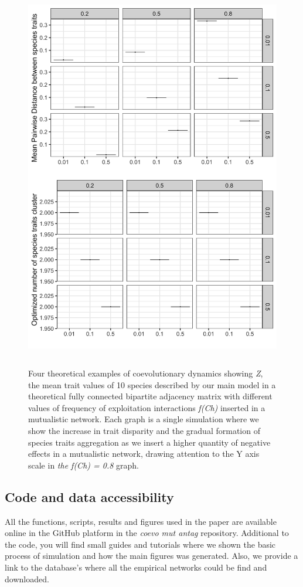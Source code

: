 \documentclass[a4paper, 12pt]{article}
\begin{document}
\begin{singlespace}
\begin{figure}[H]
 \centering
  \includegraphics[width = \linewidth, height = 17cm]{Sup_Figura_6.png}
  \vspace*{-7mm}
  \caption{Four theoretical examples of coevolutionary dynamics showing \textit{Z}, the mean trait values of 10 species described by our main model in a theoretical fully connected bipartite adjacency matrix with different values of frequency of exploitation interactions \textit{f(Ch)} inserted in a mutualistic network. Each graph is a single simulation where we show the increase in trait disparity and the gradual formation of species traits aggregation as we insert a higher quantity of negative effects in a mutualistic network, drawing attention to the Y axis scale in \textit{the f(Ch) = 0.8} graph.}
  \label{supfig:6}
\end{figure}
\end{singlespace}

\subsection*{Code and data accessibility}
All the functions, scripts, results and figures used in the paper are available online in the GitHub platform in the \textit{coevo mut antag} repository. Additional to the code, you will find small guides and tutorials where we shown the basic process of simulation and how the main figures was generated. Also, we provide a link to the database's where all the empirical networks could be find and downloaded.
\end{document}
